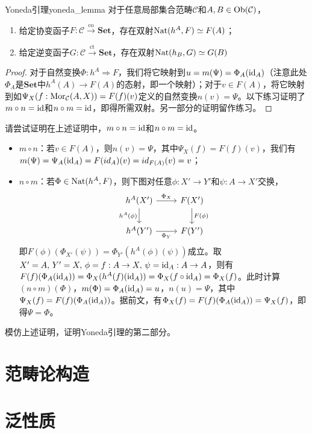 \documentclass[../main.tex]{subfiles}
\begin{document}
\begin{theorem}{Yoneda引理}{yoneda_lemma}
对于任意局部集合范畴$\mathcal{C}$和$A,B\in\operatorname{Ob}(\mathcal{C})$，
\begin{enumerate}
\item 给定协变函子$F:\mathcal{C}\overset{\text{co}}{\to}\mathbf{Set}$，存在双射$\operatorname{Nat}(h^A,F)\simeq F(A)$；
\item 给定逆变函子$G:\mathcal{C}\overset{\text{ct}}{\to}\mathbf{Set}$，存在双射$\operatorname{Nat}(h_B,G)\simeq G(B)$
\end{enumerate}
\end{theorem}
\begin{proof}
对于自然变换$\Phi:h^A\Rightarrow F$，我们将它映射到$u=m(\Psi)=\Phi_A(\operatorname{id}_A)$（注意此处$\Phi_A$是$\mathbf{Set}$中$h^A(A)\to F(A)$的态射，即一个映射）；对于$v\in F(A)$，将它映射到如$\Psi_X(f:\operatorname{Mor}_\mathcal{C}(A,X))=F(f)(v)$定义的自然变换$n(v)=\Psi$。以下练习证明了$m\circ n=\operatorname{id}$和$n\circ m=\operatorname{id}$，即得所需双射。另一部分的证明留作练习。
\end{proof}
\begin{exercise}
请尝试证明在上述证明中，$m\circ n=\operatorname{id}$和$n\circ m=\operatorname{id}$。
\end{exercise}
\begin{solution}
\begin{itemize}
\item $m\circ n$：若$v\in F(A)$，则$n(v)=\Psi$，其中$\Psi_X(f)=F(f)(v)$，我们有$m(\Psi)=\Psi_A(\operatorname{id}_A)=F(id_A)(v)=id_{F(A)}(v)=v$；
\item $n\circ m$：若$\Phi\in\operatorname{Nat}(h^A,F)$，则下图对任意$\phi:X'\to Y'$和$\psi:A\to X'$交换，
$$
\begin{tikzcd}
    h^A(X') \arrow[r, "\Phi_X"] \arrow[d, "h^A(\phi)"'] & F(X') \arrow[d, "F(\phi)"] \\
    h^A(Y') \arrow[r, "\Phi_Y"']                        & F(Y')                     
\end{tikzcd}
$$
即$F(\phi)(\Phi_{X'}(\psi))=\Phi_{Y'}(h^A(\phi)(\psi))$成立。取$X'=A,\,Y'=X,\,\phi=f:A\to X,\,\psi=\operatorname{id}_A:A\to A$，则有$F(f)(\Phi_A(\operatorname{id}_A))=\Phi_X(h^A(f)(\operatorname{id}_A))=\Phi_X(f\circ\operatorname{id}_A)=\Phi_X(f)$。此时计算$(n\circ m)(\Phi)$，$m(\Phi)=\Phi_A(\operatorname{id}_A)=u$，$n(u)=\Psi$，其中$\Psi_X(f)=F(f)(\Phi_A(\operatorname{id}_A))$。据前文，有$\Phi_X(f)=F(f)(\Phi_A(\operatorname{id}_A))=\Psi_X(f)$，即得$\Psi=\Phi$。
\end{itemize}
\end{solution}
\begin{exercise}
模仿上述证明，证明Yoneda引理的第二部分。
\end{exercise}

\section{范畴论构造}
\section{泛性质}
\biblio
\end{document}
